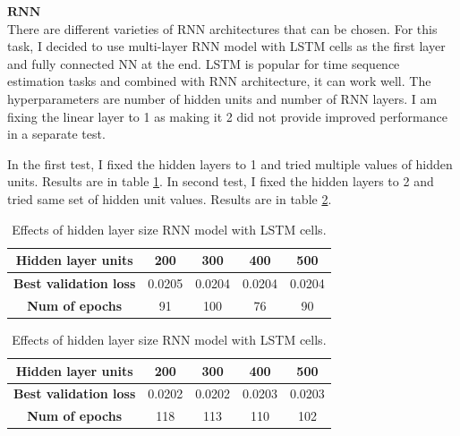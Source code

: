 \documentclass[11pt]{article}
\newcommand{\mbf}[1]{{\mathbf{#1}}}
\begin{document}
$\mbf{RNN}$ \\

There are different varieties of RNN architectures that can be chosen. For this task, I decided to use multi-layer RNN model with LSTM cells as the first layer and fully connected NN at the end. LSTM is popular for time sequence estimation tasks and combined with RNN architecture, it can work well. The hyperparameters are number of hidden units and number of RNN layers. I am fixing the linear layer to 1 as making it 2 did not provide improved performance in a separate test.

In the first test, I fixed the hidden layers to 1 and tried multiple values of hidden units. Results are in table \ref{tab:rnn_1hl_hidden_units_effects}. In second test, I fixed the hidden layers to 2 and tried same set of hidden unit values. Results are in table \ref{tab:rnn_2hl_hidden_units_effects}. \\

\begin{table}[h!]
	\begin{center}
		\begin{tabular}{c|c|c|c|c} %
			\textbf{Hidden layer units} & 200 & \bf300 & 400 & 500\\
			\hline
			\textbf{Best validation loss} & 0.0205 & 0.0204 & 0.0204 & 0.0204\\
			\hline
			\textbf{Num of epochs} & 91 & 100 & 76 & 90
		\end{tabular}
		\caption{Effects of hidden layer size RNN model with LSTM cells.}
		\label{tab:rnn_1hl_hidden_units_effects}
	\end{center}
\end{table}

\begin{table}[h!]
	\begin{center}
		\begin{tabular}{c|c|c|c|c} %
			\textbf{Hidden layer units} & 200 & \bf300 & 400 & 500\\
			\hline
			\textbf{Best validation loss} & 0.0202 & 0.0202 & 0.0203 & 0.0203\\
			\hline
			\textbf{Num of epochs} & 118 & 113 & 110 & 102
		\end{tabular}
		\caption{Effects of hidden layer size RNN model with LSTM cells.}
		\label{tab:rnn_2hl_hidden_units_effects}
	\end{center}
\end{table}
\end{document}
